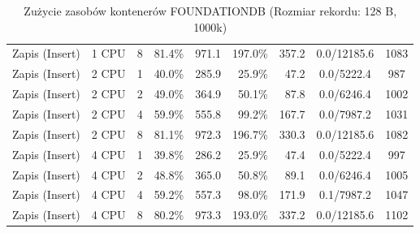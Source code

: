 \begin{table}[ht]
{\begin{tabular}{llcrrrrcc}
Zapis (Insert) & 1 CPU & 8 & 81.4\% & 971.1 & 197.0\% & 357.2 & 0.0/12185.6 & 1083 \\
Zapis (Insert) & 2 CPU & 1 & 40.0\% & 285.9 & 25.9\% & 47.2 & 0.0/5222.4 & 987 \\
Zapis (Insert) & 2 CPU & 2 & 49.0\% & 364.9 & 50.1\% & 87.8 & 0.0/6246.4 & 1002 \\
Zapis (Insert) & 2 CPU & 4 & 59.9\% & 555.8 & 99.2\% & 167.7 & 0.0/7987.2 & 1031 \\
Zapis (Insert) & 2 CPU & 8 & 81.1\% & 972.3 & 196.7\% & 330.3 & 0.0/12185.6 & 1082 \\
Zapis (Insert) & 4 CPU & 1 & 39.8\% & 286.2 & 25.9\% & 47.4 & 0.0/5222.4 & 997 \\
Zapis (Insert) & 4 CPU & 2 & 48.8\% & 365.0 & 50.8\% & 89.1 & 0.0/6246.4 & 1005 \\
Zapis (Insert) & 4 CPU & 4 & 59.2\% & 557.3 & 98.0\% & 171.9 & 0.1/7987.2 & 1047 \\
Zapis (Insert) & 4 CPU & 8 & 80.2\% & 973.3 & 193.0\% & 337.2 & 0.0/12185.6 & 1102 \\
\bottomrule
\end{tabular}%
}
\caption{Zużycie zasobów kontenerów FOUNDATIONDB (Rozmiar rekordu: 128 B, 1000k)}
\label{tab:resources_foundationdb_small_1000000}
\end{table}
